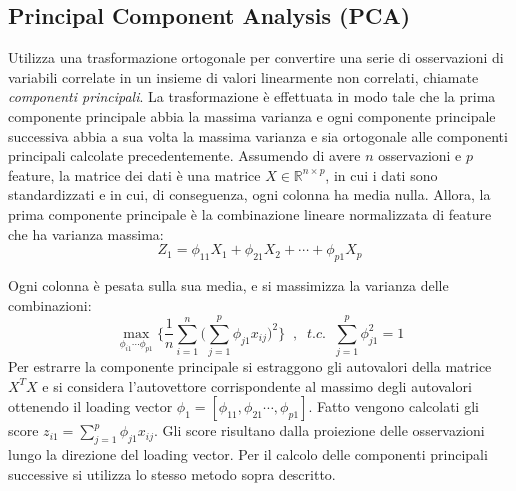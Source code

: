 \documentclass[11pt,a4paper,twocolumn]{article}
\begin{document}
\subsection{Principal Component Analysis (PCA)}
Utilizza una trasformazione ortogonale per convertire una serie di osservazioni di variabili correlate in un insieme di valori linearmente non correlati, chiamate \emph{componenti principali}. La trasformazione è effettuata in modo tale che la prima componente principale abbia la massima varianza e ogni componente principale successiva abbia a sua volta la massima varianza e sia ortogonale alle componenti principali calcolate precedentemente. Assumendo di avere $ n $ osservazioni e $ p $ feature, la matrice dei dati è una matrice $ X \in \mathbb{R}^{n \times p} $, in cui i dati sono standardizzati e in cui, di conseguenza, ogni colonna ha media nulla. Allora, la prima componente principale è la combinazione lineare normalizzata di feature che ha varianza massima:
\begin{equation}
\nonumber
Z_1=\phi_{11}X_1+\phi_{21}	X_2+\cdots+\phi_{p1}	X_p
\end{equation}

 Ogni colonna è pesata sulla sua media, e si massimizza la varianza delle combinazioni:
\begin{equation}
\nonumber
\max_{\phi_{i1} \cdots \phi_{p1}}{\Biggl\{\frac{1}{n} \sum_{i=1}^n{\Biggl(\sum_{j=1}^p{\phi_{j1}x_{ij}}\Biggr)^2}\Biggr\}} \; \; , \; \; t.c. \; \; \sum_{j=1}^p{\phi_{j1}^2}=1
\end{equation}
Per estrarre la componente principale si estraggono gli autovalori della matrice $X^TX$ e si considera l'autovettore corrispondente al massimo degli autovalori ottenendo il loading vector $\phi_1=[\phi_{11},\phi_{21} \cdots , \phi_{p1}]$. Fatto vengono calcolati gli score $z_{i1}=\sum_{j=1}^p{\phi_{j1} x_{ij}}$. Gli score risultano dalla proiezione delle osservazioni lungo la direzione del loading vector. Per il calcolo delle componenti principali successive si utilizza lo stesso metodo sopra descritto.
\end{document}
